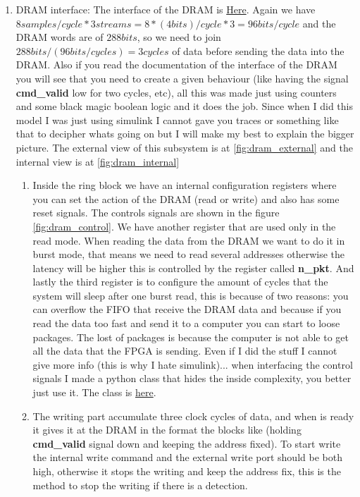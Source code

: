 \begin{enumerate}
\item DRAM interface: The interface of the DRAM is \href{https://casper.astro.berkeley.edu/wiki/Dram}{Here}. Again we have $8samples/cycle*3streams = 8*(4bits)/cycle*3 = 96bits/cycle$ and the DRAM words are of $288bits$, so we need to join $288bits/(96bits/cycles) = 3cycles$ of data before sending the data into the DRAM. Also if you read the documentation of the interface of the DRAM you will see that you need to create a given behaviour (like having the signal \textbf{cmd\_valid} low for two cycles, etc), all this was made just using counters and some black magic boolean logic and it does the job. Since when I did this model I was just using simulink I cannot gave you traces or something like that to decipher whats going on but I will make my best to explain the bigger picture. The external view of this subsystem is at \ref{fig:dram_external} and the internal view is at \ref{fig:dram_internal}
    \begin{enumerate}[label=(\alph*)]
        \item Inside the ring block we have an internal configuration registers where you can set the action of the DRAM (read or write) and also has some reset signals. The controls signals are shown in the figure \ref{fig:dram_control}. We have another register that are used only in the read mode. When reading the data from the DRAM we want to do it in burst mode, that means we need to read several addresses otherwise the latency will be higher this is controlled by the register called \textbf{n\_pkt}. And lastly the third register is to configure the amount of cycles that the system will sleep after one burst read, this is because of two reasons: you can overflow the FIFO that receive the DRAM data and because if you read the data too fast and send it to a computer you can start to loose packages. The lost of packages is because the computer is not able to get all the data that the FPGA is sending. Even if I did the stuff I cannot give more info (this is why I hate simulink)... when interfacing the control signals I made a python class that hides the inside complexity, you better just use it. The class is \href{https://github.com/sebajor/ARTE-control/blob/main/codes/dram_class.py}{here}.
        \item The writing part accumulate three clock cycles of data, and when is ready it  gives it at the DRAM in the format the blocks like (holding \textbf{cmd\_valid} signal down and keeping the address fixed). To start write the internal write command and the external write port should be both high, otherwise it stops the writing and keep the address fix, this is the method to stop the writing if there is a detection.

\end{enumerate}
\end{enumerate}
